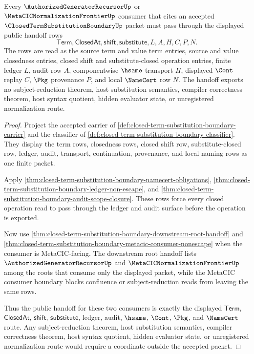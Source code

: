 \begin{theorem}
\label{thm:closed-term-substitution-boundary-metacic-public-handoff}
Every $\AuthorizedGeneratorRecursorUp$ or $\MetaCICNormalizationFrontierUp$ consumer that cites an accepted $\ClosedTermSubstitutionBoundaryUp$ packet must pass through the displayed public handoff rows
$$
\mathsf{Term},\mathsf{ClosedAt},\mathsf{shift},\mathsf{substitute},L,A,H,C,P,N.
$$
The rows are read as the source term and value term entries, source and value closedness entries, closed shift and substitute-closed operation entries, finite ledger $L$, audit row $A$, componentwise $\hsame$ transport $H$, displayed $\Cont$ replay $C$, $\Pkg$ provenance $P$, and local $\NameCert$ row $N$. The handoff exports no subject-reduction theorem, host substitution semantics, compiler correctness theorem, host syntax quotient, hidden evaluator state, or unregistered normalization route.
\end{theorem}
\begin{proof}
Project the accepted carrier of \autoref{def:closed-term-substitution-boundary-carrier} and the classifier of \autoref{def:closed-term-substitution-boundary-classifier}. They display the term rows, closedness rows, closed shift row, substitute-closed row, ledger, audit, transport, continuation, provenance, and local naming rows as one finite packet.

Apply \autoref{thm:closed-term-substitution-boundary-namecert-obligations}, \autoref{thm:closed-term-substitution-boundary-ledger-non-escape}, and \autoref{thm:closed-term-substitution-boundary-audit-scope-closure}. These rows force every closed operation read to pass through the ledger and audit surface before the operation is exported.

Now use \autoref{thm:closed-term-substitution-boundary-downstream-root-handoff} and \autoref{thm:closed-term-substitution-boundary-metacic-consumer-nonescape} when the consumer is MetaCIC-facing. The downstream root handoff lists $\AuthorizedGeneratorRecursorUp$ and $\MetaCICNormalizationFrontierUp$ among the roots that consume only the displayed packet, while the MetaCIC consumer boundary blocks confluence or subject-reduction reads from leaving the same rows.

Thus the public handoff for these two consumers is exactly the displayed $\mathsf{Term}$, $\mathsf{ClosedAt}$, $\mathsf{shift}$, $\mathsf{substitute}$, ledger, audit, $\hsame$, $\Cont$, $\Pkg$, and $\NameCert$ route. Any subject-reduction theorem, host substitution semantics, compiler correctness theorem, host syntax quotient, hidden evaluator state, or unregistered normalization route would require a coordinate outside the accepted packet.
\end{proof}
